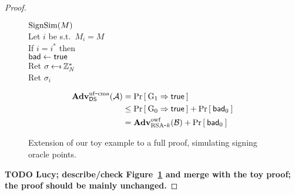 \begin{proof}
\begin{figure}
{\underline{$\textnormal{SignSim}(M)$}\\
Let $i$ be s.t.~$M_i = M$\\
If $i = i^*$ then\\
\myInd $\mathsf{bad}\gets\mathsf{true}$\\
\myInd Ret $\sigma \getsr \Z_N^*$\\
Ret $\sigma_i$
}


\begin{align*}
  \mathbf{Adv}^{\mathrm{uf\mbox{-} cma}}_{{\mathsf{DS}}}({\mathcal A}) &= \Pr\left[\: {{\textnormal G}}_1\Rightarrow\mathsf{true} \:\right]\\
      &\le \Pr\left[\: {{\textnormal G}}_0\Rightarrow\mathsf{true} \:\right] + \Pr\left[\: \mathsf{bad}_0 \:\right]\\
      &= \mathbf{Adv}^{\mathrm{owf}}_{{\textnormal{RSA}\mbox{-} k}}({\mathcal B}) + \Pr\left[\: \mathsf{bad}_0 \:\right]
\end{align*}

  \caption{Extension of our toy example to a full proof, simulating signing oracle points.}
\label{fig:fulldomainsignproof}
\end{figure}

\textbf{TODO Lucy; describe/check Figure~\ref{fig:fulldomainsignproof} and merge with the toy proof; the proof should be mainly unchanged.}

\end{proof}


